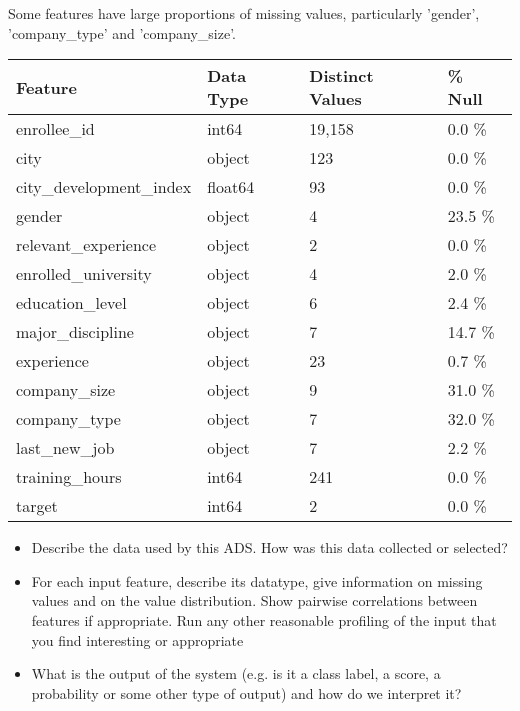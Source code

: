 \documentclass[11pt]{article}
\begin{document}
Some features have large proportions of missing values, particularly 'gender', 'company\_type' and 'company\_size'.



\begin{table}[h]
\centering
\begin{tabular}{ |p{4cm}||p{2cm}| p{2.53cm}| p{1.5cm}|}
 \hline
 Feature 		& Data Type	& Distinct Values	& \% Null\\
 \hline
enrollee\_id 	& int64 & 19,158 & 0.0 \%	\\
city			 & object & 123 & 0.0 \% \\
city\_development\_index & float64 & 93 & 0.0 \% \\
gender		& object & 4 & 23.5 \% \\
relevant\_experience & object & 2 & 0.0 \%\\

enrolled\_university & object & 4 & 2.0 \% \\

education\_level & object & 6 & 2.4 \% \\

major\_discipline  & object & 7 & 14.7 \% \\

experience  	& object & 23 & 0.7 \% \\

company\_size 	& object & 9 & 31.0 \% \\

company\_type 	& object & 7 & 32.0 \%\\

last\_new\_job 	& object & 7 & 2.2 \%\\

training\_hours & int64 & 241 & 0.0 \%  \\

target 		 & int64 & 2 & 0.0 \% \\
 \hline
\end{tabular}
\end{table}




\begin{itemize}
	\item Describe the data used by this ADS.  How was this data collected or selected?
	\item For each input feature, describe its datatype, give information on missing values and on the value distribution. Show pairwise correlations between features if appropriate.  Run any other reasonable profiling of the input that you find interesting or appropriate
	\item What is the output of the system (e.g. is it a class label, a score, a probability or some other type of output) and how do we interpret it?
\end{itemize}
\end{document}
